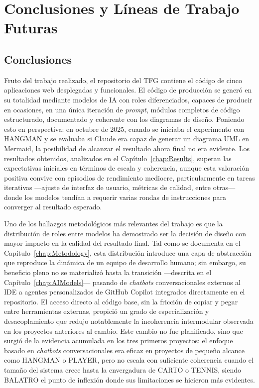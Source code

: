 
\chapter{Conclusiones y Líneas de Trabajo Futuras} \label{chap:Conclusiones}

\section{Conclusiones} \label{sec:conclusiones}

Fruto del trabajo realizado, el repositorio del \ac{TFG} \cite{URL::TFG} contiene el código de cinco aplicaciones web desplegadas y funcionales.
El código de producción se generó en su totalidad mediante modelos de \ac{IA} con roles diferenciados, capaces de producir en ocasiones, en una única iteración de \textit{prompt}, módulos completos de código estructurado, documentado y coherente con los diagramas de diseño. Poniendo esto en perspectiva: en octubre de 2025, cuando se iniciaba el experimento con \ac{HANGMAN} y se evaluaba si Claude era capaz de generar un diagrama UML en Mermaid, la posibilidad de alcanzar el resultado ahora final no era evidente. 
Los resultados obtenidos, analizados en el Capítulo~\ref{chap:Results}, superan las expectativas iniciales en términos de escala y coherencia, aunque esta valoración positiva convive con episodios de rendimiento mediocre, particularmente en tareas iterativas ---ajuste de interfaz de usuario, métricas de calidad, entre otras--- donde los modelos tendían a requerir varias rondas de instrucciones para converger al resultado esperado.

Uno de los hallazgos metodológicos más relevantes del trabajo es que la distribución de roles entre modelos ha demostrado ser la decisión de diseño con mayor impacto en la calidad del resultado final. Tal como se documenta en el Capítulo~\ref{chap:Metodology}, esta distribución introduce una capa de abstracción que reproduce la dinámica de un equipo de desarrollo humano; sin embargo, su beneficio pleno no se materializó hasta la transición ---descrita en el Capítulo~\ref{chap:AIModels}--- pasando de \textit{chatbots} conversacionales externos al \ac{IDE} a agentes personalizados de GitHub Copilot integrados directamente en el repositorio. El acceso directo al código base, sin la fricción de copiar y pegar entre herramientas externas, propició un grado de especialización y desacoplamiento que redujo notablemente la incoherencia intermodular observada en los proyectos anteriores al cambio. Este cambio no fue planificado, sino que surgió de la evidencia acumulada en los tres primeros proyectos: el enfoque basado en \textit{chatbots} conversacionales era eficaz en proyectos de pequeño alcance como \ac{HANGMAN} o \ac{PLAYER}, pero no escala con suficiente coherencia cuando el tamaño del sistema crece hasta la envergadura de \ac{CARTO} o \ac{TENNIS}, siendo \ac{BALATRO} el punto de inflexión donde sus limitaciones se hicieron más evidentes.

